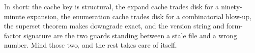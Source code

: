 In short: the cache key is structural, the expand cache trades disk for a
ninety-minute expansion, the enumeration cache trades disk for a combinatorial
blow-up, the superset theorem makes downgrade exact, and the version string and
form-factor signature are the two guards standing between a stale file and a
wrong number. Mind those two, and the rest takes care of itself.
